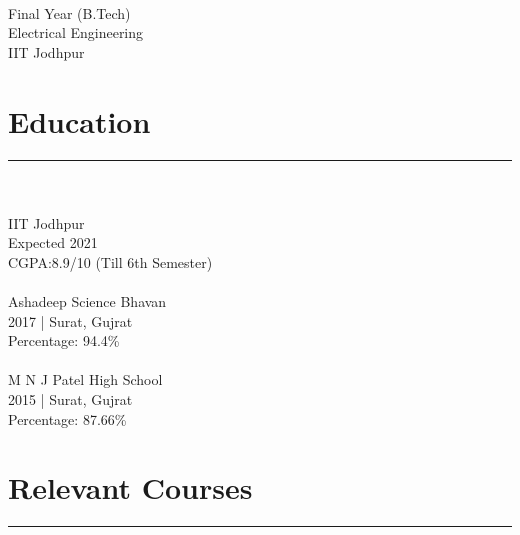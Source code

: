 \documentclass[]{resume}
\begin{document}
\begin{minipage}[t]{0.3\textwidth} 
\vspace{-2em}
\begin{large}
	\\
\end{large}
Final Year (B.Tech)\\
Electrical  Engineering\\ 
IIT Jodhpur  \\ 
\vspace{-1.8em}

\section{Education}
\vspace{-0.5em}
\noindent\rule{5.2cm}{0.4pt}\\

\vspace{-0.7em}
\\
IIT Jodhpur \\
Expected 2021\\
CGPA:8.9/10 (Till 6th Semester)\\

\vspace{-0.5em}
\\
Ashadeep Science Bhavan\\
2017 | Surat, Gujrat \\
Percentage: 94.4\%\\

\vspace{-0.5em}
\\
M N J Patel High School\\
2015 | Surat, Gujrat \\
Percentage: 87.66\%\\
\sectionsep
\vspace{-1.5em}

\section{Relevant Courses}
\vspace{-0.5em}
\noindent\rule{5.2cm}{0.4pt}\\


\end{minipage}
\end{document}

